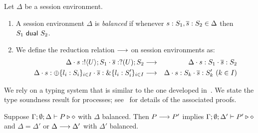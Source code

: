 \documentclass[a4paper,UKenglish]{lipics}
\theoremstyle{definition}
\begin{document}

\begin{definition}\label{d:wtenvred}%
	Let $\Delta$ be a session environment.
	\begin{enumerate}[$\bullet$]
	\item A session environment $\Delta$ is {\em balanced} if whenever
	$s: S_1, \overline{s}: S_2 \in \Delta$ then $S_1 \ \mathsf{dual}\  S_2$.
	\item We define the reduction relation $\longrightarrow$ on session environments as: %
\begin{eqnarray*}
	\Delta \cat s: \btout{U} S_1 \cat \dual{s}: \btinp{U} S_2  & \red & 
	\Delta \cat s: S_1 \cat \dual{s}: S_2  \\
	\Delta \cat s: \btsel{l_i: S_i}_{i \in I} \cat \dual{s}: \btbra{l_i: S_i'}_{i \in I} &\red& \Delta \cat s: S_k \cat \dual{s}: S_k' \ (k \in I)
\end{eqnarray*}
\end{enumerate}
\end{definition}

\noi We rely on a typing system that is similar to the one developed in~\cite{tlca07,MostrousY15}. 
We state the type soundness result for \HOp processes;
see~\cite{KouzapasPY15} for details of the associated proofs.


\begin{theorem}\label{t:sr}%
			Suppose $\Gamma; \emptyset; \Delta \vdash P \triangleright \diamond$
			with
			$\Delta$ balanced. 
			Then $P \longrightarrow P'$ implies $\Gamma; \emptyset; \Delta'  \vdash P' \triangleright \diamond$
			and $\Delta = \Delta'$ or $\Delta \longrightarrow \Delta'$
			with $\Delta'$ balanced. 
\end{theorem}
\end{document}
